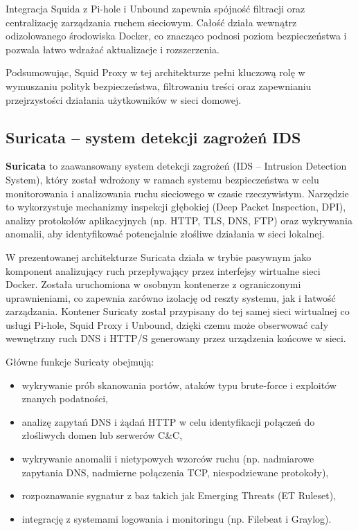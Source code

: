 \documentclass[
    left=2.5cm,         %
    right=2.5cm,        %
    top=2.5cm,          %
    bottom=3cm,         %
    bindingoffset=6mm,  %
    nohyphenation=true %
]{eiti/eiti-thesis} %
\begin{document}
Integracja Squida z Pi-hole i Unbound zapewnia spójność filtracji oraz centralizację zarządzania ruchem sieciowym. Całość działa wewnątrz odizolowanego środowiska Docker, co znacząco podnosi poziom bezpieczeństwa i pozwala łatwo wdrażać aktualizacje i rozszerzenia.

Podsumowując, Squid Proxy w tej architekturze pełni kluczową rolę w wymuszaniu polityk bezpieczeństwa, filtrowaniu treści oraz zapewnianiu przejrzystości działania użytkowników w sieci domowej.

\subsection{Suricata – system detekcji zagrożeń IDS}

\textbf{Suricata} to zaawansowany system detekcji zagrożeń (IDS – Intrusion Detection System), który został wdrożony w ramach systemu bezpieczeństwa w celu monitorowania i analizowania ruchu sieciowego w czasie rzeczywistym. Narzędzie to wykorzystuje mechanizmy inspekcji głębokiej (Deep Packet Inspection, DPI), analizy protokołów aplikacyjnych (np. HTTP, TLS, DNS, FTP) oraz wykrywania anomalii, aby identyfikować potencjalnie złośliwe działania w sieci lokalnej.

W prezentowanej architekturze Suricata działa w trybie pasywnym jako komponent analizujący ruch przepływający przez interfejsy wirtualne sieci Docker. Została uruchomiona w osobnym kontenerze z ograniczonymi uprawnieniami, co zapewnia zarówno izolację od reszty systemu, jak i łatwość zarządzania. Kontener Suricaty został przypisany do tej samej sieci wirtualnej co usługi Pi-hole, Squid Proxy i Unbound, dzięki czemu może obserwować cały wewnętrzny ruch DNS i HTTP/S generowany przez urządzenia końcowe w sieci.

Główne funkcje Suricaty obejmują:
\begin{itemize}
    \item wykrywanie prób skanowania portów, ataków typu brute-force i exploitów znanych podatności,
    \item analizę zapytań DNS i żądań HTTP w celu identyfikacji połączeń do złośliwych domen lub serwerów C\&C,
    \item wykrywanie anomalii i nietypowych wzorców ruchu (np. nadmiarowe zapytania DNS, nadmierne połączenia TCP, niespodziewane protokoły),
    \item rozpoznawanie sygnatur z baz takich jak Emerging Threats (ET Ruleset),
    \item integrację z systemami logowania i monitoringu (np. Filebeat i Graylog).
\end{itemize}
\end{document}
